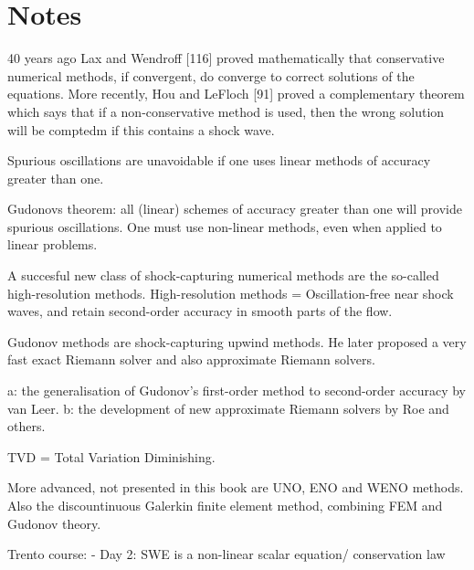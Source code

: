 \section*{Notes}

40 years ago Lax and Wendroff [116] proved mathematically that conservative numerical methods, if convergent, do converge to correct solutions of the equations.
More recently, Hou and LeFloch [91] proved a complementary theorem which says that if a non-conservative method is used, then the wrong solution will be comptedm if this contains a shock wave.

Spurious oscillations are unavoidable if one uses linear methods of accuracy greater than one.

Gudonovs theorem: all (linear) schemes of accuracy greater than one will provide spurious oscillations. One must use non-linear methods, even when applied to linear problems.

A succesful new class of shock-capturing numerical methods are the so-called high-resolution methods.
High-resolution methods = Oscillation-free near shock waves, and retain second-order accuracy in smooth parts of the flow.

Gudonov methods are shock-capturing upwind methods. He later proposed a very fast exact Riemann solver and also approximate Riemann solvers.

a: the generalisation of Gudonov's first-order method to second-order accuracy by van Leer.
b: the development of new approximate Riemann solvers by Roe and others.

 
TVD = Total Variation Diminishing.


More advanced, not presented in this book are UNO, ENO and WENO methods. Also the discountinuous Galerkin finite element method, combining FEM and Gudonov theory.

Trento course:
- Day 2: SWE is a non-linear scalar equation/ conservation law 






